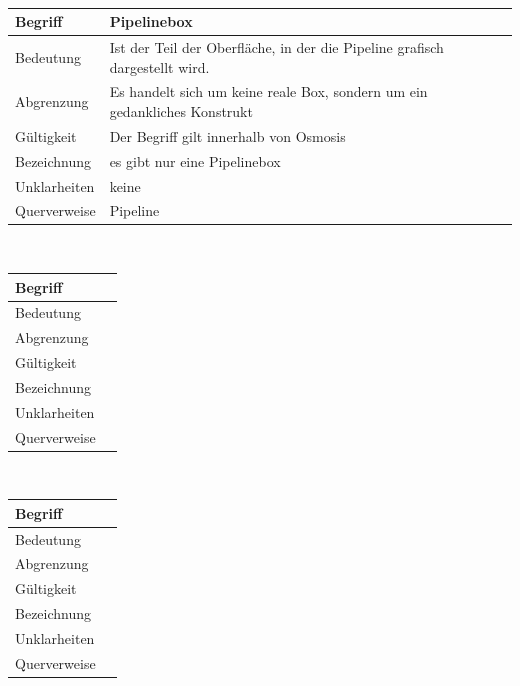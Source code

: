 \documentclass[a4paper,10pt]{scrartcl}
\begin{document}
\\
\begin{tabular}{|p{5cm}|p{10cm}|}
\hline Begriff & Pipelinebox \\ 
\hline Bedeutung & Ist der Teil der Oberfläche, in der die Pipeline grafisch dargestellt wird. \\ 
\hline Abgrenzung & Es handelt sich um keine reale Box, sondern um ein gedankliches Konstrukt \\ 
\hline Gültigkeit & Der Begriff gilt innerhalb von Osmosis \\ 
\hline Bezeichnung & es gibt nur eine Pipelinebox \\ 
\hline Unklarheiten & keine \\ 
\hline Querverweise & Pipeline \\ 
\hline 
\end{tabular}
\\
\begin{tabular}{|p{5cm}|p{10cm}|}
\hline Begriff &  \\ 
\hline Bedeutung &  \\ 
\hline Abgrenzung &  \\ 
\hline Gültigkeit &  \\ 
\hline Bezeichnung &  \\ 
\hline Unklarheiten &  \\ 
\hline Querverweise &  \\ 
\hline 
\end{tabular}
\\
\begin{tabular}{|p{5cm}|p{10cm}|}
\hline Begriff &  \\ 
\hline Bedeutung &  \\ 
\hline Abgrenzung &  \\ 
\hline Gültigkeit &  \\ 
\hline Bezeichnung &  \\ 
\hline Unklarheiten &  \\ 
\hline Querverweise &  \\ 
\hline 
\end{tabular}
\end{document}
